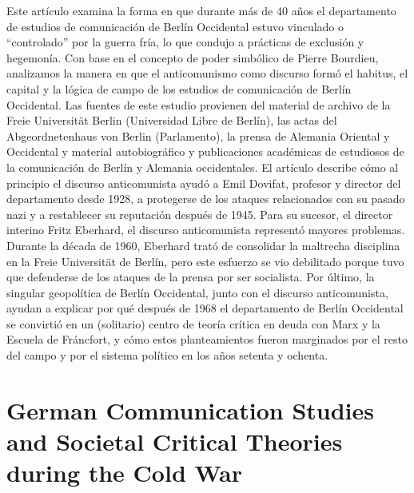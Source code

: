 \documentclass{tufte-handout}
\begin{document}
Este artículo examina la forma en que durante más de 40 años el
departamento de estudios de comunicación de Berlín Occidental estuvo
vinculado o ``controlado'' por la guerra fría, lo que condujo a
prácticas de exclusión y hegemonía. Con base en el concepto de poder
simbólico de Pierre Bourdieu, analizamos la manera en que el
anticomunismo como discurso formó el habitus, el capital y la lógica de
campo de los estudios de comunicación de Berlín Occidental. Las fuentes
de este estudio provienen del material de archivo de la Freie
Universität Berlin (Universidad Libre de Berlín), las actas del
Abgeordnetenhaus von Berlin (Parlamento), la prensa de Alemania Oriental
y Occidental y material autobiográfico y publicaciones académicas de
estudiosos de la comunicación de Berlín y Alemania occidentales. El
artículo describe cómo al principio el discurso anticomunista ayudó a
Emil Dovifat, profesor y director del departamento desde 1928, a
protegerse de los ataques relacionados con su pasado nazi y a
restablecer su reputación después de 1945. Para su sucesor, el director
interino Fritz Eberhard, el discurso anticomunista representó mayores
problemas. Durante la década de 1960, Eberhard trató de consolidar la
maltrecha disciplina en la Freie Universität de Berlín, pero este
esfuerzo se vio debilitado porque tuvo que defenderse de los ataques de
la prensa por ser socialista. Por último, la singular geopolítica de
Berlín Occidental, junto con el discurso anticomunista, ayudan a
explicar por qué después de 1968 el departamento de Berlín Occidental se
convirtió en un (solitario) centro de teoría crítica en deuda con Marx y
la Escuela de Fráncfort, y cómo estos planteamientos fueron marginados
por el resto del campo y por el sistema político en los años setenta y
ochenta.

\vspace*{2em}

\newpage

\hypertarget{german-communication-studies-and-societal-critical-theories-during-the-cold-war}{%
\section{German Communication Studies and Societal Critical Theories
\\\noindent during the Cold
War}}\label{german-communication-studies-and-societal-critical-theories-during-the-cold-war}

 \enlargethispage{-\baselineskip}
 
\end{document}
